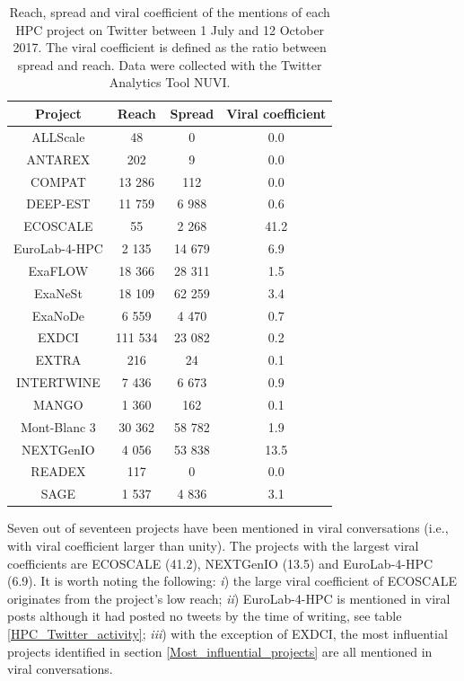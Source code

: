 \begin{table}[t]
 \begin{center}
 {\scriptsize
  \begin{tabular}{cccc}
   \hline 
   \hline
   Project & Reach & Spread & Viral coefficient \\ 
   \hline
   \hline
   ALLScale & 48 & 0 & 0.0 \\
   ANTAREX & 202 & 9 & 0.0 \\
   COMPAT & 13 286 & 112 & 0.0 \\
   DEEP-EST & 11 759 & 6 988 & 0.6 \\
   ECOSCALE & 55 & 2 268 & 41.2 \\
   EuroLab-4-HPC & 2 135 & 14 679 & 6.9 \\
   ExaFLOW & 18 366 & 28 311 & 1.5 \\
   ExaNeSt & 18 109 & 62 259 & 3.4  \\
   ExaNoDe & 6 559 & 4 470 & 0.7 \\
   EXDCI & 111 534 & 23 082 & 0.2 \\
   EXTRA & 216 & 24 & 0.1 \\
   INTERTWINE & 7 436 & 6 673 & 0.9 \\
   MANGO & 1 360 & 162 & 0.1 \\
   Mont-Blanc 3 & 30 362 & 58 782 & 1.9 \\
   NEXTGenIO & 4 056 & 53 838 & 13.5 \\
   READEX & 117 & 0 & 0.0 \\
   SAGE & 1 537 & 4 836 & 3.1 \\ 
   \hline
   \hline
  \end{tabular}
 } 
 \end{center} 
 \caption{Reach, spread and viral coefficient of the mentions of each HPC project on Twitter between 1 July and 12 October 2017. The viral coefficient is defined as the ratio between spread and reach. Data were collected with the Twitter Analytics Tool NUVI.}
\label{HPC_viral_coefficients} 
\end{table}

Seven out of seventeen projects have been mentioned in viral conversations (i.e., with viral coefficient larger than unity). The projects with the largest viral coefficients are ECOSCALE (41.2), NEXTGenIO (13.5) and EuroLab-4-HPC (6.9). It is worth noting the following: \textit{i}) the large viral coefficient of ECOSCALE originates from the project's low reach; \textit{ii}) EuroLab-4-HPC is mentioned in viral posts although it had posted no tweets by the time of writing, see table \ref{HPC_Twitter_activity}; \textit{iii}) with the exception of EXDCI, the most influential projects identified in section \ref{Most_influential_projects} are all mentioned in viral conversations.

